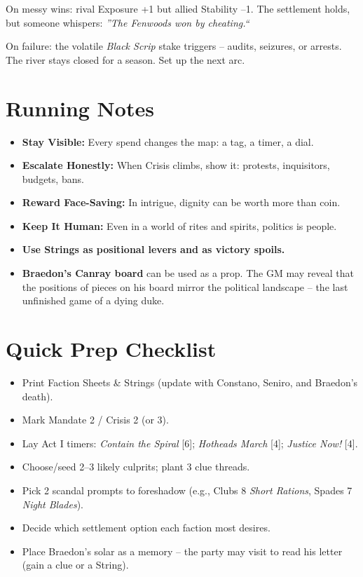 \documentclass[11pt]{article}
\begin{document}
On messy wins: rival Exposure +1 but allied Stability --1. The settlement holds, but someone whispers: \textit{''The Fenwoods won by cheating.``}

On failure: the volatile \textit{Black Scrip} stake triggers -- audits, seizures, or arrests. The river stays closed for a season. Set up the next arc.

\section*{Running Notes}
\begin{itemize}
  \item \textbf{Stay Visible:} Every spend changes the map: a tag, a timer, a dial.
  \item \textbf{Escalate Honestly:} When Crisis climbs, show it: protests, inquisitors, budgets, bans.
  \item \textbf{Reward Face-Saving:} In intrigue, dignity can be worth more than coin.
  \item \textbf{Keep It Human:} Even in a world of rites and spirits, politics is people.
  \item \textbf{Use Strings as positional levers and as victory spoils.}
  \item \textbf{Braedon's Canray board} can be used as a prop. The GM may reveal that the positions of pieces on his board mirror the political landscape -- the last unfinished game of a dying duke.
\end{itemize}

\section*{Quick Prep Checklist}
\begin{itemize}
  \item Print Faction Sheets \& Strings (update with Constano, Seniro, and Braedon's death).
  \item Mark Mandate 2 / Crisis 2 (or 3).
  \item Lay Act I timers: \textit{Contain the Spiral} [6]; \textit{Hotheads March} [4]; \textit{Justice Now!} [4].
  \item Choose/seed 2--3 likely culprits; plant 3 clue threads.
  \item Pick 2 scandal prompts to foreshadow (e.g., Clubs 8 \textit{Short Rations}, Spades 7 \textit{Night Blades}).
  \item Decide which settlement option each faction most desires.
  \item Place Braedon's solar as a memory -- the party may visit to read his letter (gain a clue or a String).
\end{itemize}
\end{document}

